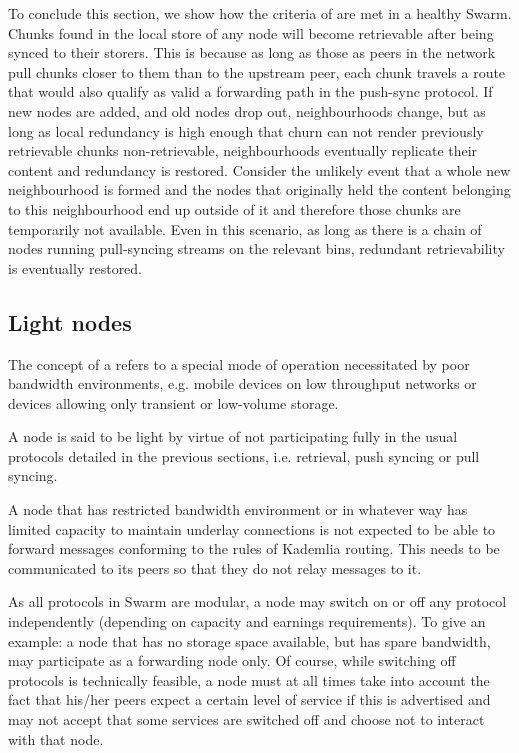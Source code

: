 To conclude this section, we show how the criteria of  are met in a healthy Swarm. Chunks found in the local store of any node will become retrievable after being synced to their storers. This is because as long as those as peers in the network pull chunks closer to them than to the upstream peer, each chunk travels a route that would also qualify as valid a forwarding path in the push-sync protocol. If new nodes are added, and old nodes drop out, neighbourhoods change, but as long as local redundancy is high enough that churn can not render previously retrievable chunks non-retrievable, neighbourhoods eventually replicate their content and redundancy is restored. Consider the unlikely event that a whole new neighbourhood is formed and the nodes that originally held the content belonging to this neighbourhood end up outside of it and therefore those chunks are temporarily not available. Even in this scenario, as long as there is a chain of nodes running pull-syncing streams on the relevant bins, redundant retrievability is eventually restored.

\subsection{Light nodes\statusgreen}
\label{sec:light}

The concept of a  refers to a special mode of operation necessitated by poor bandwidth environments, e.g. mobile devices on low throughput networks or devices allowing only transient or low-volume storage.

A node is said to be light by virtue of not participating fully in the usual protocols detailed in the previous sections, i.e. retrieval, push syncing or pull syncing. 

A node that has restricted bandwidth environment or in whatever way has limited capacity to maintain underlay connections is not expected to be able to forward messages conforming to the rules of Kademlia routing. This needs to be communicated to its peers so that they do not relay messages to it. 

As all protocols in Swarm are modular, a node may switch on or off any protocol independently (depending on capacity and earnings requirements). To give an example: a node that has no storage space available, but has spare bandwidth, may participate as a forwarding node only. Of course, while switching off protocols is technically feasible, a node must at all times take into account the fact that his/her peers expect a certain level of service if this is advertised and may not accept that some services are switched off and choose not to interact with that node. 

